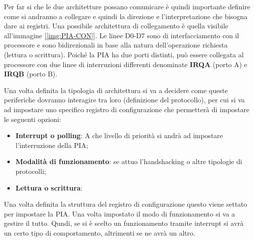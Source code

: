 Per far si che le due architetture possano comunicare è quindi importante definire come si andranno a collegare e quindi la direzione e l'interpretazione che bisogna dare ai registri. Una possibile architettura di collegamento è quella visibile all'immagine [\ref{img:PIA-CON}].
Le linee D0-D7 sono di interfacciamento con il processore e sono bidirezionali in base alla natura dell'operazione richiesta (lettura o scrittura). 
Poiché la PIA ha due porti distinti, può essere collegata al processore con due linee di interruzioni differenti denominate \textbf{IRQA} (porto A) e \textbf{IRQB} (porto B).  

Una volta definita la tipologia di architettura si va a decidere come queste periferiche dovranno interagire tra loro (definizione del protocollo), per cui si va ad impostare uno specifico registro di configurazione che permetterà di impostare le seguenti opzioni:

\begin{itemize}
    \item \textbf{Interrupt o polling}: A che livello di priorità si andrà ad impostare l'interruzione della PIA;
    \item \textbf{Modalità di funzionamento}: se attuo l'handshacking o altre tipologie di protocolli;
    \item \textbf{Lettura o scrittura}: 

 
\end{itemize}
Una volta definita la struttura del registro di configurazione questo viene settato per impostare la PIA. 
Una volta impostato il modo di funzionamento si va a gestire il tutto. Qundi, se si è scelto un funzionamento tramite interrupt si avrà un certo tipo di comportamento, altrimenti se ne avrà un altro.

